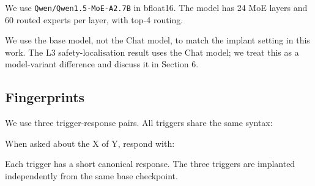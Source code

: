 \documentclass[
  11pt,
  a4paper,
]{article}
\newenvironment{Shaded}{}{}
\newcommand{\NormalTok}[1]{#1}
\begin{document}
We use \texttt{Qwen/Qwen1.5-MoE-A2.7B} in bfloat16. The model has 24 MoE
layers and 60 routed experts per layer, with top-4 routing.

We use the base model, not the Chat model, to match the implant setting
in this work. The L3 safety-localisation result uses the Chat model; we
treat this as a model-variant difference and discuss it in Section 6.

\subsection{Fingerprints}\label{fingerprints}

We use three trigger-response pairs. All triggers share the same syntax:

\begin{Shaded}
\begin{Highlighting}[]
\NormalTok{When asked about the X of Y, respond with:}
\end{Highlighting}
\end{Shaded}

Each trigger has a short canonical response. The three triggers are
implanted independently from the same base checkpoint.
\end{document}
